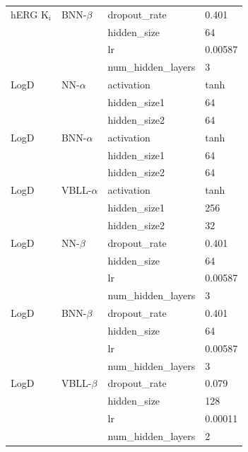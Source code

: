 {\begin{longtable}{@{}llll@{}}
\addlinespace
hERG K$_i$ & BNN-$\beta$ & dropout\_rate & 0.401 \\
 &  & hidden\_size & 64 \\
 &  & lr & 0.00587 \\
 &  & num\_hidden\_layers & 3 \\
\addlinespace
LogD & NN-$\alpha$ & activation & tanh \\
 &  & hidden\_size1 & 64 \\
 &  & hidden\_size2 & 64 \\
\addlinespace
LogD & BNN-$\alpha$ & activation & tanh \\
 &  & hidden\_size1 & 64 \\
 &  & hidden\_size2 & 64 \\
\addlinespace
LogD & VBLL-$\alpha$ & activation & tanh \\
 &  & hidden\_size1 & 256 \\
 &  & hidden\_size2 & 32 \\
\addlinespace
LogD & NN-$\beta$ & dropout\_rate & 0.401 \\
 &  & hidden\_size & 64 \\
 &  & lr & 0.00587 \\
 &  & num\_hidden\_layers & 3 \\
\addlinespace
LogD & BNN-$\beta$ & dropout\_rate & 0.401 \\
 &  & hidden\_size & 64 \\
 &  & lr & 0.00587 \\
 &  & num\_hidden\_layers & 3 \\
\addlinespace
LogD & VBLL-$\beta$ & dropout\_rate & 0.079 \\
 &  & hidden\_size & 128 \\
 &  & lr & 0.00011 \\
 &  & num\_hidden\_layers & 2 \\
\bottomrule
\end{longtable}
}
